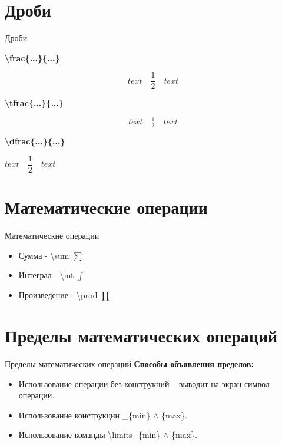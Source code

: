 \documentclass[aspectratio=169]{beamer}
\begin{document}
\section{Дроби}
\begin{frame}{Дроби}
    \begin{minipage}{0.3\textwidth}
        \bf{\textbackslash frac\{...\}\{...\}}
        
        \begin{equation*}
            text \quad \frac{1}{2} \quad text
        \end{equation*}   
    \end{minipage}
    \begin{minipage}{0.3\textwidth}
        \bf{\textbackslash tfrac\{...\}\{...\}}

        \begin{equation*}
            text \quad \tfrac{1}{2} \quad text
        \end{equation*}  
    \end{minipage}
    \begin{minipage}{0.3\textwidth}
        \bf{\textbackslash dfrac\{...\}\{...\}}

        $text \quad \dfrac{1}{2} \quad text$
    \end{minipage}
\end{frame}

\section{Математические операции}
\begin{frame}{Математические операции}
    \begin{itemize}
        \item Сумма - \textbackslash sum $\displaystyle\sum$
        \item Интеграл - \textbackslash int $\displaystyle\int$ 
        \item Произведение - \textbackslash prod $\displaystyle\prod$
    \end{itemize}
\end{frame}

\section{Пределы математических операций}
\begin{frame}{Пределы математических операций}
    \textbf{Способы объявления пределов:}
    \begin{itemize}
        \item Использование операции без конструкций – выводит на экран символ операции.
        \item Использование конструкции \_\{min\} $\wedge$ \{max\}.
        \item Использование команды \textbackslash limits\_\{min\} $\wedge$ \{max\}.
    \end{itemize}
\end{frame}
\end{document}
